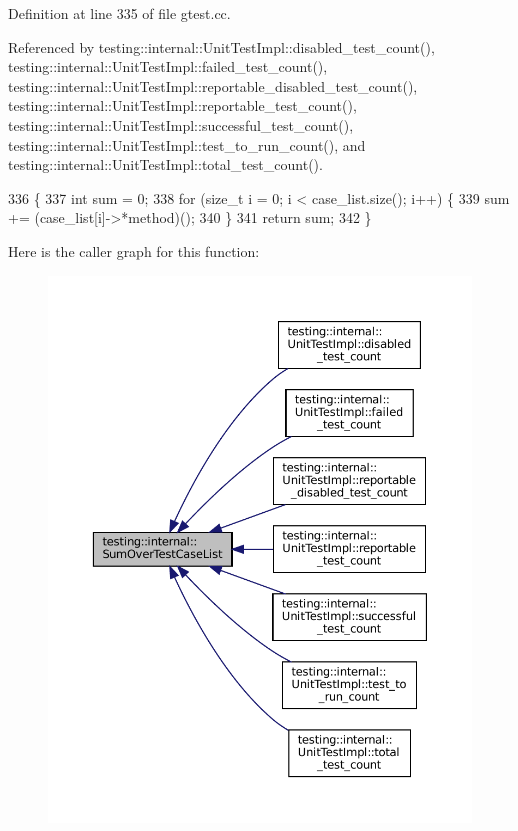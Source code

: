 Definition at line 335 of file gtest.\+cc.



Referenced by testing\+::internal\+::\+Unit\+Test\+Impl\+::disabled\+\_\+test\+\_\+count(), testing\+::internal\+::\+Unit\+Test\+Impl\+::failed\+\_\+test\+\_\+count(), testing\+::internal\+::\+Unit\+Test\+Impl\+::reportable\+\_\+disabled\+\_\+test\+\_\+count(), testing\+::internal\+::\+Unit\+Test\+Impl\+::reportable\+\_\+test\+\_\+count(), testing\+::internal\+::\+Unit\+Test\+Impl\+::successful\+\_\+test\+\_\+count(), testing\+::internal\+::\+Unit\+Test\+Impl\+::test\+\_\+to\+\_\+run\+\_\+count(), and testing\+::internal\+::\+Unit\+Test\+Impl\+::total\+\_\+test\+\_\+count().


\begin{DoxyCode}
336                                                               \{
337   \textcolor{keywordtype}{int} sum = 0;
338   \textcolor{keywordflow}{for} (\textcolor{keywordtype}{size\_t} i = 0; i < case\_list.size(); i++) \{
339     sum += (case\_list[i]->*method)();
340   \}
341   \textcolor{keywordflow}{return} sum;
342 \}
\end{DoxyCode}
Here is the caller graph for this function\+:
\nopagebreak
\begin{figure}[H]
\begin{center}
\leavevmode
\includegraphics[width=350pt]{namespacetesting_1_1internal_a564f9e608c608736ebe2199ab831745b_icgraph}
\end{center}
\end{figure}
\mbox{\label{namespacetesting_1_1internal_ac467e871e4781da3f5ebed2a4465aec4}} 
